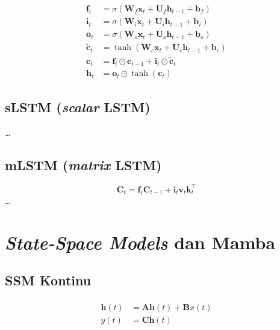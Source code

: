 \begin{align}
\mathbf{f}_t &= \sigma(\mathbf{W}_f \mathbf{x}_t + \mathbf{U}_f \mathbf{h}_{t-1} + \mathbf{b}_f) \label{eq:bab3_lstm_f} \\
\mathbf{i}_t &= \sigma(\mathbf{W}_i \mathbf{x}_t + \mathbf{U}_i \mathbf{h}_{t-1} + \mathbf{b}_i) \\
\mathbf{o}_t &= \sigma(\mathbf{W}_o \mathbf{x}_t + \mathbf{U}_o \mathbf{h}_{t-1} + \mathbf{b}_o) \\
\tilde{\mathbf{c}}_t &= \tanh(\mathbf{W}_c \mathbf{x}_t + \mathbf{U}_c \mathbf{h}_{t-1} + \mathbf{b}_c) \\
\mathbf{c}_t &= \mathbf{f}_t \odot \mathbf{c}_{t-1} + \mathbf{i}_t \odot \tilde{\mathbf{c}}_t \\
\mathbf{h}_t &= \mathbf{o}_t \odot \tanh(\mathbf{c}_t)
\end{align}

\subsection{sLSTM (\emph{scalar} LSTM)}
\label{subsec:bab3_slstm}

\dots

\subsection{mLSTM (\emph{matrix} LSTM)}
\label{subsec:bab3_mlstm}

\begin{equation}
\mathbf{C}_t = \mathbf{f}_t \mathbf{C}_{t-1} + \mathbf{i}_t \mathbf{v}_t \mathbf{k}_t^{\top}
\label{eq:bab3_mlstm_C}
\end{equation}
\dots

\section{\emph{State-Space Models} dan Mamba}
\label{subsec:bab3_ssm}

\subsection{SSM Kontinu}
\label{subsec:bab3_ssm_kontinu}

\begin{align}
\dot{\mathbf{h}}(t) &= \mathbf{A} \mathbf{h}(t) + \mathbf{B} x(t) \\
y(t) &= \mathbf{C} \mathbf{h}(t)
\label{eq:bab3_ssm_kontinu}
\end{align}

